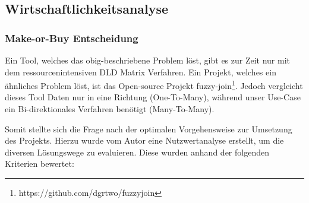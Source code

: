 \subsection{Wirtschaftlichkeitsanalyse}
\subsubsection{Make-or-Buy Entscheidung}
Ein Tool, welches das obig-beschriebene Problem löst, gibt es zur Zeit nur mit dem
ressourcenintensiven DLD Matrix Verfahren. Ein Projekt, welches ein ähnliches
Problem löst, ist das Open-source Projekt fuzzy-join\footnote{https://github.com/dgrtwo/fuzzyjoin}.
Jedoch vergleicht dieses Tool Daten nur in eine Richtung (One-To-Many), während unser
Use-Case ein Bi-direktionales Verfahren benötigt (Many-To-Many).\par

Somit stellte sich die Frage nach der optimalen Vorgehensweise zur Umsetzung des
Projekts. Hierzu wurde vom Autor eine Nutzwertanalyse erstellt, um die diversen
Lösungswege zu evaluieren. Diese wurden anhand der folgenden Kriterien bewertet:


